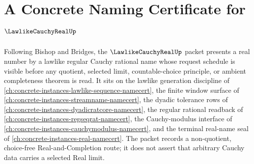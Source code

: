 \chapter{A Concrete Naming Certificate for $\LawlikeCauchyRealUp$}
\label{ch:concrete-instances-lawlike-cauchy-real-namecert}

Following Bishop and Bridges, the $\LawlikeCauchyRealUp$ packet presents a real number by a lawlike regular Cauchy rational name whose request schedule is visible before any quotient, selected limit, countable-choice principle, or ambient completeness theorem is read. It sits on the lawlike generation discipline of \autoref{ch:concrete-instances-lawlike-sequence-namecert}, the finite window surface of \autoref{ch:concrete-instances-streamname-namecert}, the dyadic tolerance rows of \autoref{ch:concrete-instances-dyadicratcore-namecert}, the regular rational readback of \autoref{ch:concrete-instances-regseqrat-namecert}, the Cauchy-modulus interface of \autoref{ch:concrete-instances-cauchymodulus-namecert}, and the terminal real-name seal of \autoref{ch:concrete-instances-real-namecert}. The packet records a non-quotient, choice-free Real-and-Completion route; it does not assert that arbitrary Cauchy data carries a selected Real limit.

